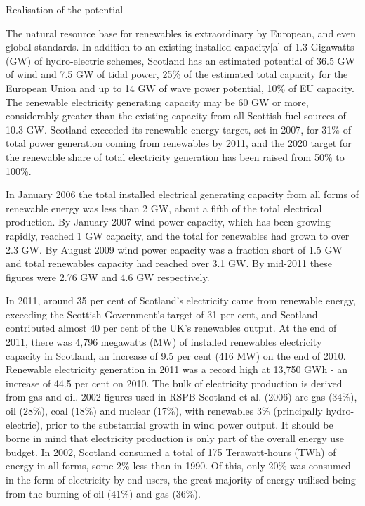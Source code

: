 \begin{tcolorbox}\footnotesize

\noindent
Realisation of the potential

\noindent
The natural resource base for renewables is extraordinary by European, and even global standards. In addition to an existing installed capacity[a] of 1.3 Gigawatts (GW) of hydro-electric schemes, Scotland has an estimated potential of 36.5 GW of wind and 7.5 GW of tidal power, 25\% of the estimated total capacity for the European Union and up to 14 GW of wave power potential, 10\% of EU capacity. The renewable electricity generating capacity may be 60 GW or more, considerably greater than the existing capacity from all Scottish fuel sources of 10.3 GW. Scotland exceeded its renewable energy target, set in 2007, for 31\% of total power generation coming from renewables by 2011, and the 2020 target for the renewable share of total electricity generation has been raised from 50\% to 100\%. 

\noindent
In January 2006 the total installed electrical generating capacity from all forms of renewable energy was less than 2 GW, about a fifth of the total electrical production. By January 2007 wind power capacity, which has been growing rapidly, reached 1 GW capacity, and the total for renewables had grown to over 2.3 GW. By August 2009 wind power capacity was a fraction short of 1.5 GW and total renewables capacity had reached over 3.1 GW. By mid-2011 these figures were 2.76 GW and 4.6 GW respectively. 

\noindent
In 2011, around 35 per cent of Scotland’s electricity came from renewable energy, exceeding the Scottish Government’s target of 31 per cent, and Scotland contributed almost 40 per cent of the UK’s renewables output. At the end of 2011, there was 4,796 megawatts (MW) of installed renewables electricity capacity in Scotland, an increase of 9.5 per cent (416 MW) on the end of 2010. Renewable electricity generation in 2011 was a record high at 13,750 GWh - an increase of 44.5 per cent on 2010. The bulk of electricity production is derived from gas and oil. 2002 figures used in RSPB Scotland et al. (2006) are gas (34\%), oil (28\%), coal (18\%) and nuclear (17\%), with renewables 3\% (principally hydro-electric), prior to the substantial growth in wind power output. It should be borne in mind that electricity production is only part of the overall energy use budget. In 2002, Scotland consumed a total of 175 Terawatt-hours (TWh) of energy in all forms, some 2\% less than in 1990. Of this, only 20\% was consumed in the form of electricity by end users, the great majority of energy utilised being from the burning of oil (41\%) and gas (36\%). 


\end{tcolorbox}
